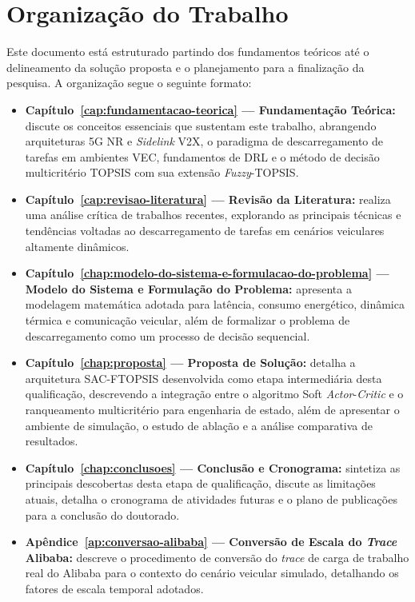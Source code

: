 \section{Organização do Trabalho}
\label{sec:organizacao}

Este documento está estruturado partindo dos fundamentos teóricos até o delineamento da solução proposta e o planejamento para a finalização da pesquisa. A organização segue o seguinte formato:

\begin{itemize}

    \item \textbf{Capítulo~\ref{cap:fundamentacao-teorica} --- Fundamentação Teórica:} discute os conceitos essenciais que sustentam este trabalho, abrangendo arquiteturas \gls{5G} \gls{NR} e \textit{Sidelink} \gls{V2X}, o paradigma de descarregamento de tarefas em ambientes \gls{VEC}, fundamentos de \gls{DRL} e o método de decisão multicritério \gls{TOPSIS} com sua extensão \textit{Fuzzy}-\gls{TOPSIS}.

    \item \textbf{Capítulo~\ref{cap:revisao-literatura} --- Revisão da Literatura:} realiza uma análise crítica de trabalhos recentes, explorando as principais técnicas e tendências voltadas ao descarregamento de tarefas em cenários veiculares altamente dinâmicos.

    \item \textbf{Capítulo~\ref{chap:modelo-do-sistema-e-formulacao-do-problema} --- Modelo do Sistema e Formulação do Problema:} apresenta a modelagem matemática adotada para latência, consumo energético, dinâmica térmica e comunicação veicular, além de formalizar o problema de descarregamento como um processo de decisão sequencial.

    \item \textbf{Capítulo~\ref{chap:proposta} --- Proposta de Solução:} detalha a arquitetura \gls{SAC}-FTOPSIS desenvolvida como etapa intermediária desta qualificação, descrevendo a integração entre o algoritmo Soft \textit{Actor}-\textit{Critic} e o ranqueamento multicritério para engenharia de estado, além de apresentar o ambiente de simulação, o estudo de ablação e a análise comparativa de resultados.

    \item \textbf{Capítulo~\ref{chap:conclusoes} --- Conclusão e Cronograma:} sintetiza as principais descobertas desta etapa de qualificação, discute as limitações atuais, detalha o cronograma de atividades futuras e o plano de publicações para a conclusão do doutorado.

    \item \textbf{Apêndice~\ref{ap:conversao-alibaba} --- Conversão de Escala do \textit{Trace} Alibaba:} descreve o procedimento de conversão do \textit{trace} de carga de trabalho real do Alibaba para o contexto do cenário veicular simulado, detalhando os fatores de escala temporal adotados.
\end{itemize}